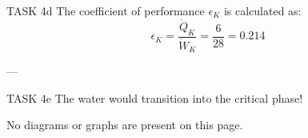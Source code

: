 TASK 4d  
The coefficient of performance \( \epsilon_K \) is calculated as:  
\[
\epsilon_K = \frac{\dot{Q}_K}{\dot{W}_K} = \frac{6}{28} = 0.214
\]

---

TASK 4e  
The water would transition into the critical phase!  

No diagrams or graphs are present on this page.